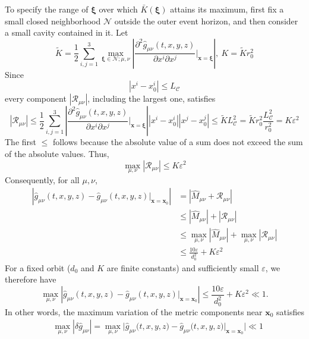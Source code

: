 \documentclass[english]{article}
\begin{document}
 To specify the range of $\boldsymbol{\xi}$ over which $\bar{K}(\boldsymbol{\xi})$
attains its maximum, first fix a small closed neighborhood $\mathcal{N}$
outside the outer event horizon, and then consider a small cavity
contained in it. Let 
\[
\tilde{K}=\frac{1}{2}\sum^{3}_{i,j=1}\max_{\boldsymbol{\xi}\in\mathcal{N};\mu,\nu}\left|\frac{\partial^{2}\hat{g}_{\mu\nu}\left(t,x,y,z\right)}{\partial x^{i}\partial x^{j}}\Bigg|_{\boldsymbol{x}=\boldsymbol{\xi}}\right|,\ K=\tilde{K}r^{2}_{0}
\]
 Since 
\[
\left|x^{i}-x^{i}_{0}\right|\leq L_{\mathcal{C}}
\]
 every component $\left|\mathcal{R}_{\mu\nu}\right|$, including the
largest one, satisfies 
\[
\left|\mathcal{R}_{\mu\nu}\right|\leq\frac{1}{2}\sum^{3}_{i,j=1}\left|\frac{\partial^{2}\hat{g}_{\mu\nu}\left(t,x,y,z\right)}{\partial x^{i}\partial x^{j}}\Bigg|_{\boldsymbol{x}=\boldsymbol{\xi}}\right|\left|x^{i}-x^{i}_{0}\right|\left|x^{j}-x^{j}_{0}\right|\leq\tilde{K}L^{2}_{\mathcal{C}}=\tilde{K}r^{2}_{0}\frac{L^{2}_{\mathcal{C}}}{r^{2}_{0}}=K\varepsilon^{2}
\]
 The first $\leq$ follows because the absolute value of a sum does
not exceed the sum of the absolute values. Thus, 
\[
\max_{\mu,\nu}\left|\mathcal{R}_{\mu\nu}\right|\leq K\varepsilon^{2}
\]
 Consequently, for all $\mu,\nu$, 
\begin{align*}
\left|\hat{g}_{\mu\nu}\left(t,x,y,z\right)-\hat{g}_{\mu\nu}\left(t,x,y,z\right)\big|_{\boldsymbol{x}=\boldsymbol{x}_{0}}\right| & =\left|\hat{M}_{\mu\nu}+\mathcal{R}_{\mu\nu}\right|\\
 & \leq\left|\hat{M}_{\mu\nu}\right|+\left|\mathcal{R}_{\mu\nu}\right|\\
 & \leq\max_{\mu,\nu}\left|\hat{M}_{\mu\nu}\right|+\max_{\mu,\nu}\left|\mathcal{R}_{\mu\nu}\right|\\
 & \leq\frac{10\varepsilon}{d^{2}_{0}}+K\varepsilon^{2}
\end{align*}
 For a fixed orbit ($d_{0}$ and $K$ are finite constants) and sufficiently
small $\varepsilon$, we therefore have 
\[
\max_{\mu,\nu}\left|\hat{g}_{\mu\nu}\left(t,x,y,z\right)-\hat{g}_{\mu\nu}\left(t,x,y,z\right)\big|_{\boldsymbol{x}=\boldsymbol{x}_{0}}\right|\leq\frac{10\varepsilon}{d^{2}_{0}}+K\varepsilon^{2}\ll1.
\]
 In other words, the maximum variation of the metric components near
$\boldsymbol{x}_{0}$ satisfies 
\begin{align*}
 & \max_{\mu,\nu}|\delta\hat{g}_{\mu\nu}|=\max_{\mu,\nu}\biggl|\hat{g}_{\mu\nu}\biggl(t,x,y,z\biggr)-\hat{g}_{\mu\nu}\biggl(t,x,y,z\biggr)\big|_{\boldsymbol{x}=\boldsymbol{x}_{0}}\biggr|\ll1
\end{align*}
\end{document}
